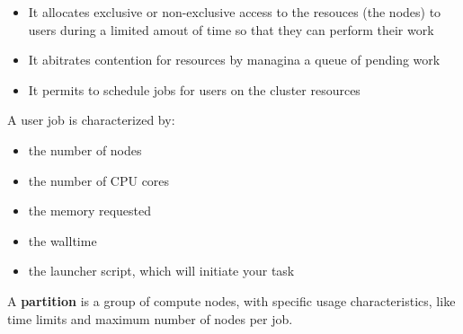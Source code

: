 \begin{itemize}
    \item It allocates exclusive or non-exclusive access to the resouces (the nodes) to users during a limited amout of time so that they can perform their work
    \item It abitrates contention for resources by managina a queue of pending work 
    \item It permits to schedule jobs for users on the cluster resources 
\end{itemize}

A user job is characterized by:
\begin{itemize}
    \item the number of nodes 
    \item the number of CPU cores 
    \item the memory requested 
    \item the walltime 
    \item the launcher script, which will initiate your task 
\end{itemize}

A \textbf{partition} is a group of compute nodes, with specific usage characteristics, like time limits and maximum number of nodes per job.

